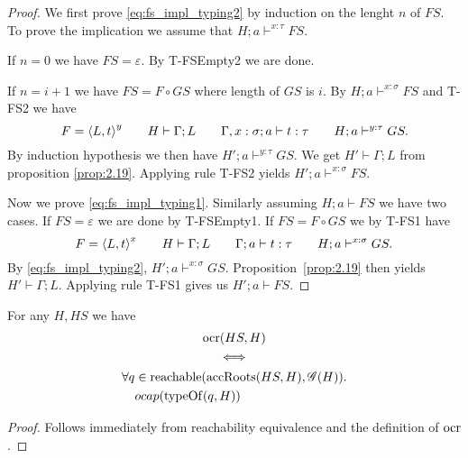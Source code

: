 \begin{proof}
  We first prove \eqref{eq:fs_impl_typing2} by induction on the lenght $n$ of
  $FS$. To prove the implication we assume that $H; a \vdash^{x: \tau} FS$.
  
  If $n = 0$ we have $FS = \varepsilon$. By {\sc T-FSEmpty2} we are done.
  
  If $n = i + 1$ we have $FS = F \circ GS$ where length of $GS$ is $i$. By  
  $H; a \vdash^{x: \sigma} FS$ and {\sc T-FS2} we have 
  \begin{equation*}
    F = \mbox{$\langle L, t \rangle$}^{y} \quad\quad H \vdash \Gamma; L \quad\quad \mbox{$\Gamma, x:
    \sigma;a\vdash t:\tau$} \quad\quad H; a \vdash^{y: \tau} GS.
  \end{equation*}
  By induction hypothesis we then have $H'; a \vdash^{y: \tau} GS$. We get $H'
  \vdash \Gamma; L$ from proposition \ref{prop:2.19}. Applying rule {\sc T-FS2}
  yields $H'; a \vdash^{x: \sigma} FS$.

  Now we prove \eqref{eq:fs_impl_typing1}. Similarly assuming $H; a \vdash FS$
  we have two cases. If $FS = \varepsilon$ we are done by {\sc T-FSEmpty1}. If
  $FS = F \circ GS$ we by {\sc T-FS1} have
  \begin{equation*}
    F = \mbox{$\langle L, t \rangle$}^{x} \quad\quad H \vdash \Gamma; L \quad\quad
    \mbox{$\Gamma;a\vdash t:\tau$} \quad\quad H; a \vdash^{x: \sigma} GS.
  \end{equation*}
  By \eqref{eq:fs_impl_typing2}, $H'; a \vdash^{x: \sigma} GS$. 
  Proposition~\ref{prop:2.19} then yields $H' \vdash \Gamma; L$. Applying rule {\sc
  T-FS1} gives us $H'; a \vdash FS$.
\end{proof}

\begin{proposition} \label{prop:ocrloc_eq}
  For any $H, HS$ we have
  \begin{equation*}
    \begin{gathered}
      \mbox{$\mathrm{ocr}$}(HS, H) \\
      \iff  \\
      \begin{aligned}
        \forall q &\in \mbox{$\mathrm{reachable}$}(\mbox{$\mathrm{accRoots}$}(HS, H), \mathscr{G}(H)). \\
        & \mbox{$ocap$}(\mbox{$\mathrm{typeOf}$}(q, H))
      \end{aligned}
    \end{gathered}
  \end{equation*}
\end{proposition}
\begin{proof}
  Follows immediately from reachability equivalence and the definition of
  $\mbox{$\mathrm{ocr}$}$.
\end{proof}


